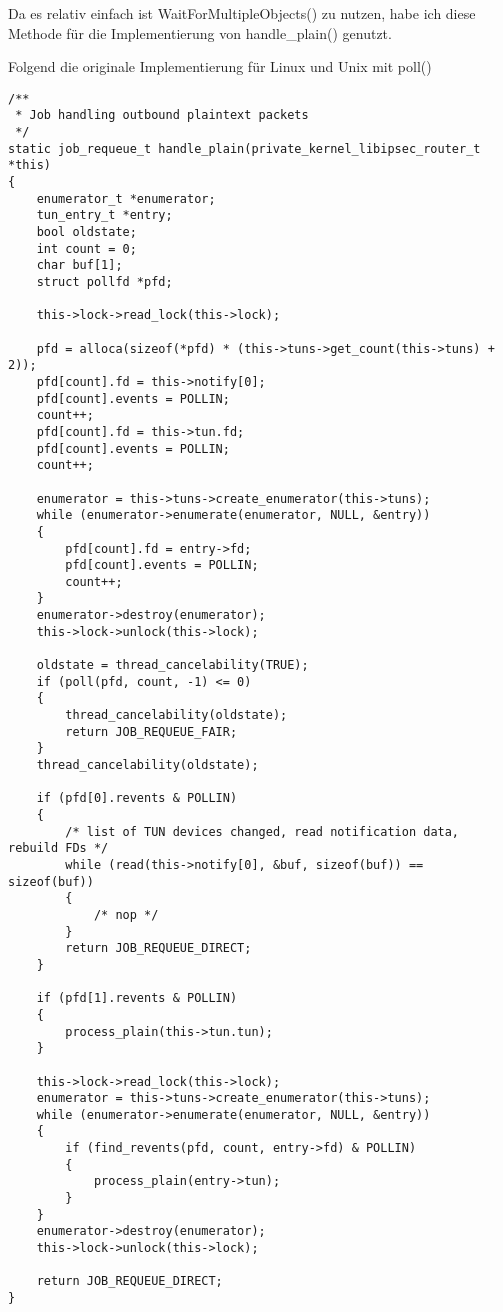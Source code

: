 
Da es relativ einfach ist WaitForMultipleObjects() zu nutzen, habe ich diese Methode
für die Implementierung von handle\_plain() genutzt.

Folgend die originale Implementierung für Linux und Unix mit poll()
\begin{lstlisting}[caption=Code für handle\_plain auf Unix/Linux]
/**
 * Job handling outbound plaintext packets
 */
static job_requeue_t handle_plain(private_kernel_libipsec_router_t *this)
{
	enumerator_t *enumerator;
	tun_entry_t *entry;
	bool oldstate;
	int count = 0;
	char buf[1];
	struct pollfd *pfd;

	this->lock->read_lock(this->lock);

	pfd = alloca(sizeof(*pfd) * (this->tuns->get_count(this->tuns) + 2));
	pfd[count].fd = this->notify[0];
	pfd[count].events = POLLIN;
	count++;
	pfd[count].fd = this->tun.fd;
	pfd[count].events = POLLIN;
	count++;

	enumerator = this->tuns->create_enumerator(this->tuns);
	while (enumerator->enumerate(enumerator, NULL, &entry))
	{
		pfd[count].fd = entry->fd;
		pfd[count].events = POLLIN;
		count++;
	}
	enumerator->destroy(enumerator);
	this->lock->unlock(this->lock);

	oldstate = thread_cancelability(TRUE);
	if (poll(pfd, count, -1) <= 0)
	{
		thread_cancelability(oldstate);
		return JOB_REQUEUE_FAIR;
	}
	thread_cancelability(oldstate);

	if (pfd[0].revents & POLLIN)
	{
		/* list of TUN devices changed, read notification data, rebuild FDs */
		while (read(this->notify[0], &buf, sizeof(buf)) == sizeof(buf))
		{
			/* nop */
		}
		return JOB_REQUEUE_DIRECT;
	}

	if (pfd[1].revents & POLLIN)
	{
		process_plain(this->tun.tun);
	}

	this->lock->read_lock(this->lock);
	enumerator = this->tuns->create_enumerator(this->tuns);
	while (enumerator->enumerate(enumerator, NULL, &entry))
	{
		if (find_revents(pfd, count, entry->fd) & POLLIN)
		{
			process_plain(entry->tun);
		}
	}
	enumerator->destroy(enumerator);
	this->lock->unlock(this->lock);

	return JOB_REQUEUE_DIRECT;
}
\end{lstlisting}

